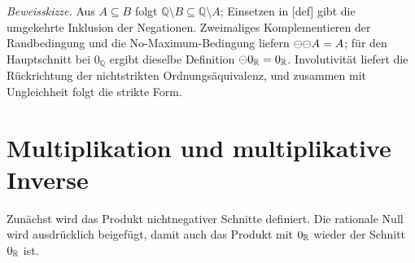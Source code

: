 \documentclass[main.tex]{subfiles}
\begin{document}

\emph{Beweisskizze.}
Aus \(A\subseteq B\) folgt
\(\mathbb Q\setminus B\subseteq\mathbb Q\setminus A\); Einsetzen in
[def] gibt die umgekehrte Inklusion der
Negationen. Zweimaliges Komplementieren der Randbedingung und die
No-Maximum-Bedingung liefern \(\mathop{\ominus}\!\mathop{\ominus}\!A=A\); für den Hauptschnitt
bei \(0_{\mathbb Q}\) ergibt dieselbe Definition
\(\mathop{\ominus}\!0_{\mathbb R}=0_{\mathbb R}\). Involutivität liefert die Rückrichtung der
nichtstrikten Ordnungsäquivalenz, und zusammen mit Ungleichheit folgt die
strikte Form.

\section{Multiplikation und multiplikative Inverse}

Zunächst wird das Produkt nichtnegativer Schnitte definiert. Die rationale
Null wird ausdrücklich beigefügt, damit auch das Produkt mit
\(0_{\mathbb R}\) wieder der Schnitt \(0_{\mathbb R}\) ist.

\end{document}
